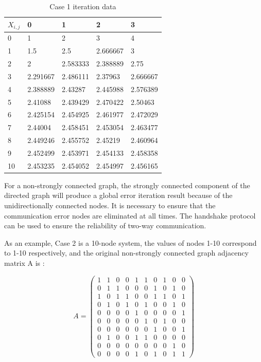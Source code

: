 \documentclass[conference]{IEEEtran}
\begin{document}
\begin{table}[htbp]
    \centering
    \caption{Case 1 iteration data}
    \begin{tabular}{lllll}
    \hline
    \hline
    $X_{i,j}$   & 0        & 1        & 2        & 3        \\ \hline
    0  & 1        & 2        & 3        & 4        \\ 
    1  & 1.5      & 2.5      & 2.666667 & 3        \\ 
    2  & 2        & 2.583333 & 2.388889 & 2.75     \\ 
    3  & 2.291667 & 2.486111 & 2.37963  & 2.666667 \\ 
    4  & 2.388889 & 2.43287  & 2.445988 & 2.576389 \\ 
    5  & 2.41088  & 2.439429 & 2.470422 & 2.50463  \\ 
    6  & 2.425154 & 2.454925 & 2.461977 & 2.472029 \\ 
    7  & 2.44004  & 2.458451 & 2.453054 & 2.463477 \\ 
    8  & 2.449246 & 2.455752 & 2.45219  & 2.460964 \\ 
    9  & 2.452499 & 2.453971 & 2.454133 & 2.458358 \\ 
    10 & 2.453235 & 2.454052 & 2.454997 & 2.456165 \\ 
    \hline
    \hline
    \end{tabular}
    \label{tab:Result-1234}
\end{table}

For a non-strongly connected graph, the strongly connected component of the directed graph will produce a global error iteration result because of the unidirectionally connected nodes. It is necessary to ensure that the communication error nodes are eliminated at all times. The handshake protocol can be used to ensure the reliability of two-way communication.

As an example, Case 2 is a 10-node system, the values of nodes 1-10 correspond to 1-10 respectively, and the original non-strongly connected graph adjacency matrix A is :

\begin{equation}
    A=\left(\begin{array}{cccccccccc}
    1 & 1 & 0 & 0 & 1 & 1 & 0 & 1 & 0 & 0 \\
    0 & 1 & 1 & 0 & 0 & 0 & 1 & 0 & 1 & 0 \\
    1 & 0 & 1 & 1 & 0 & 0 & 1 & 1 & 0 & 1 \\
    0 & 1 & 0 & 1 & 0 & 1 & 0 & 0 & 1 & 0 \\
    0 & 0 & 0 & 0 & 1 & 0 & 0 & 0 & 0 & 1 \\
    0 & 0 & 0 & 0 & 0 & 1 & 0 & 1 & 0 & 0 \\
    0 & 0 & 0 & 0 & 0 & 0 & 1 & 0 & 0 & 1 \\
    0 & 1 & 0 & 0 & 1 & 1 & 0 & 0 & 0 & 0 \\
    0 & 0 & 0 & 0 & 0 & 0 & 0 & 0 & 1 & 0 \\
    0 & 0 & 0 & 0 & 1 & 0 & 1 & 0 & 1 & 1
    \end{array}\right)
\end{equation}
\end{document}

